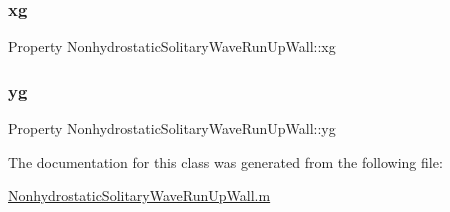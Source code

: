 \subsubsection{\texorpdfstring{xg}{xg}}
{\footnotesize\ttfamily Property Nonhydrostatic\+Solitary\+Wave\+Run\+Up\+Wall\+::xg}

\mbox{\label{class_nonhydrostatic_solitary_wave_run_up_wall_a86a5d4259833f04b6ebcb1f232868e18}} 
\subsubsection{\texorpdfstring{yg}{yg}}
{\footnotesize\ttfamily Property Nonhydrostatic\+Solitary\+Wave\+Run\+Up\+Wall\+::yg}



The documentation for this class was generated from the following file\+:\begin{DoxyCompactItemize}
\item 
\hyperlink{_nonhydrostatic_solitary_wave_run_up_wall_8m}{Nonhydrostatic\+Solitary\+Wave\+Run\+Up\+Wall.\+m}\end{DoxyCompactItemize}
